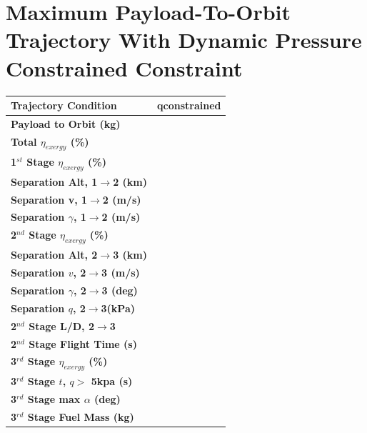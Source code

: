 		\chapter{Maximum Payload-To-Orbit Trajectory With Dynamic Pressure Constrained Constraint}\label{sec:Appendix_qconst}
	\begin{table}[ht]
	\centering
\begin{tabular}{l c } 
	\hline \textbf{Trajectory Condition}
	&qconstrained
	
	\\
	\hline \textbf{Payload to Orbit (kg)}
	& \textbf{\PayloadToOrbitqconstrained}
	\\
	\textbf{Total $\eta_{exergy}$ (\%)}
	& \textbf{\totalExergyEffqconstrained}
	\\
	\hline 
	\textbf{1$^{st}$ Stage $\eta_{exergy}$ (\%)}
	& \textbf{\firstExergyEffqconstrained}
	\\
	\textbf{Separation Alt, 1$\rightarrow$2 (km)}
	& \firstsecondSeparationAltqconstrained
	\\
	\textbf{Separation v, 1$\rightarrow$2 (m/s)}
	& \firstsecondSeparationvqconstrained
	\\
	\textbf{Separation $\gamma$, 1$\rightarrow$2 (m/s)}
	& \firstsecondSeparationgammaqconstrained
	\\
	\hline 
	\textbf{2$^{nd}$ Stage $\eta_{exergy}$ (\%)}
	& \textbf{\secondExergyEffqconstrained}
	\\
	\textbf{Separation Alt, 2$\rightarrow$3 (km)}
	& \secondthirdSeparationAltqconstrained
	\\
	\textbf{Separation $v$, 2$\rightarrow$3 (m/s)}
	& \secondthirdSeparationvqconstrained
	\\
	\textbf{Separation $\gamma$, 2$\rightarrow$3 (deg)}
	& \secondthirdSeparationgammaqconstrained
	\\
	\textbf{Separation $q$, 2$\rightarrow$3(kPa)}
	& \secondthirdSeparationqqconstrained
	\\
	\textbf{2$^{nd}$ Stage L/D, 2$\rightarrow$3}
	& \secondthirdSeparationLDqconstrained
	\\
	\textbf{2$^{nd}$ Stage Flight Time (s)}
	& \secondFlightTimeqconstrained
	\\
	\hline 
	\textbf{3$^{rd}$ Stage $\eta_{exergy}$ (\%)}
	& \textbf{\thirddExergyEffqconstrained}
	\\
	\textbf{3$^{rd}$ Stage $t$, $q >$ 5kpa (s)}
	& \thirdqOverFiveqconstrained
	\\
	\textbf{3$^{rd}$ Stage max $\alpha$ (deg)}
	& \thirdmaxAoAqconstrained
	\\
	\textbf{3$^{rd}$ Stage Fuel Mass (kg)}
	& \thirdmFuelqconstrained
	\\
	\hline 
\end{tabular} 

	\end{table}
		
